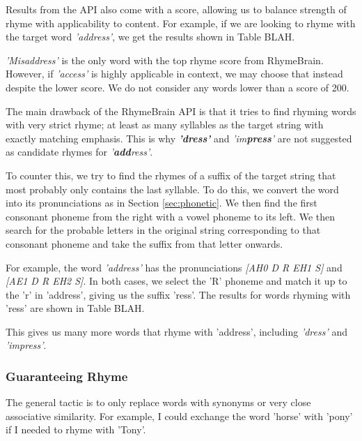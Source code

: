 Results from the API also come with a score, allowing us to balance strength of rhyme with applicability to content. For example, if we are looking to rhyme with the target word \textit{'address'}, we get the results shown in Table BLAH.


\textit{'Misaddress'} is the only word with the top rhyme score from RhymeBrain. However, if \textit{'access'} is highly applicable in context, we may choose that instead despite the lower score. We do not consider any words lower than a score of 200.

The main drawback of the RhymeBrain API is that it tries to find rhyming words with very strict rhyme; at least as many syllables as the target string with exactly matching emphasis. This is why \textbf{\textit{'dress'}} and \textit{'im\textbf{press}'} are not suggested as candidate rhymes for \textit{'\textbf{add}ress'}.

To counter this, we try to find the rhymes of a suffix of the target string that most probably only contains the last syllable. To do this, we convert the word into its pronunciations as in Section \ref{sec:phonetic}. We then find the first consonant phoneme from the right with a vowel phoneme to its left. We then search for the probable letters in the original string corresponding to that consonant phoneme and take the suffix from that letter onwards.

For example, the word \textit{'address'} has the pronunciations \textit{[AH0 D R EH1 S]} and \textit{[AE1 D R EH2 S]}. In both cases, we select the 'R' phoneme and match it up to the 'r' in 'address', giving us the suffix 'ress'. The results for words rhyming with 'ress' are shown in Table BLAH.


This gives us many more words that rhyme with 'address', including \textit{'dress'} and \textit{'impress'}.

\subsubsection{Guaranteeing Rhyme}

The general tactic is to only replace words with synonyms or very close associative similarity. For example, I could exchange the word 'horse' with 'pony' if I needed to rhyme with 'Tony'. 

